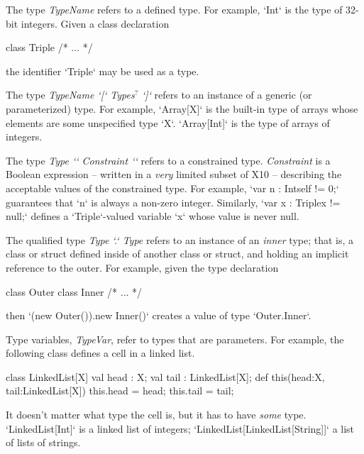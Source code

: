 The type {\em TypeName} refers to a defined type.  For example, 
\xcd`Int`
is the type of 32-bit integers.
Given a class declaration 
\begin{xten}
class Triple { /* ... */ }
\end{xten}
%
the identifier \xcd`Triple` may be used as a type.

The type {\em TypeName \xcd`[` Types{$^?$} \xcd`]`} refers to an instance of a
generic (or parameterized) type.  For example, \xcd`Array[X]` is the built-in
type of arrays whose elements are some unspecified type \xcd`X`.
\xcd`Array[Int]` is the type of arrays of integers. 

The type {\em Type \xcd`{` Constraint \xcd`}`} refers to a constrained type.
{\em Constraint} is a Boolean expression -- written in a {\em very} limited
subset of X10 -- describing the acceptable values of the constrained type.
For example, \xcd`var n : Int{self != 0};` guarantees that \xcd`n` is always a
non-zero integer. 
Similarly, \xcd`var x : Triple{x != null};` defines a \xcd`Triple`-valued
variable \xcd`x` whose value is never null.

The qualified type {\em Type \xcd`.` Type} refers to an instance of an {\em
inner} type; that is, a class or struct defined inside of another class or
struct, and holding an implicit reference to the outer.  For example, given
the type declaration 
\begin{xten}
class Outer {
  class Inner { /* ... */ }
}
\end{xten}
%
then 
\xcd`(new Outer()).new Inner()` creates a value of type 
\xcd`Outer.Inner`.

Type variables, {\em TypeVar}, refer to types that are parameters.  For
example, the following class defines a cell in a linked list.  
\begin{xten}
class LinkedList[X] {
  val head : X;
  val tail : LinkedList[X];
  def this(head:X, tail:LinkedList[X]) {
     this.head = head; this.tail = tail;
  }
}
\end{xten}
%
It doesn't
matter what type the cell is, but it has to have {\em some} type.
\xcd`LinkedList[Int]` is a linked list of integers;
\xcd`LinkedList[LinkedList[String]]` a list of lists of strings.

